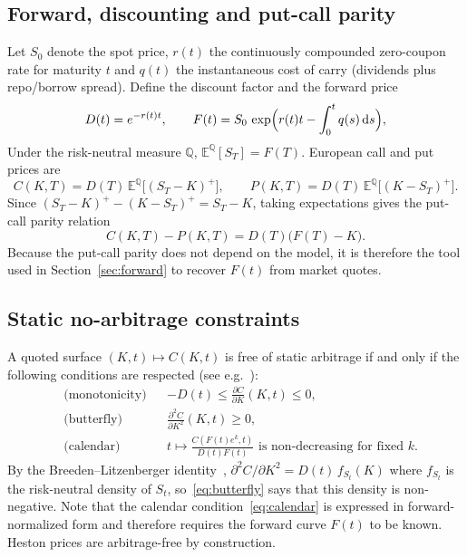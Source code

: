 \documentclass[11pt,a4paper]{article}
\theoremstyle{plain}
\theoremstyle{definition}
\newcommand{\dd}{\mathrm{d}}
\newcommand{\E}{\mathbb{E}}
\newcommand{\Q}{\mathbb{Q}}
\begin{document}
\subsection{Forward, discounting and put-call parity}
Let $S_0$ denote the spot price, $r(t)$ the continuously compounded zero-coupon rate for maturity $t$ and $q(t)$ the instantaneous cost of carry (dividends plus repo/borrow spread). Define the discount factor and the forward price
\begin{equation}
    D(t) = e^{-r(t)t}, \qquad F(t) = S_0\, \exp\Bigl(r(t)t-\int_0^t q(s)\,\dd s\Bigr),
    \label{eq:forward}
\end{equation}
Under the risk-neutral measure $\Q$, $\E^{\Q}[S_T]=F(T)$. European call and put prices are
\begin{equation}
    C(K,T) = D(T)\,\E^{\Q}\bigl[(S_T-K)^+\bigr], \qquad
    P(K,T) = D(T)\,\E^{\Q}\bigl[(K-S_T)^+\bigr].
\end{equation}
Since $(S_T-K)^+-(K-S_T)^+=S_T-K$, taking expectations gives the put-call parity relation
\begin{equation}
    C(K,T)-P(K,T) = D(T)\bigl(F(T)-K\bigr).
    \label{eq:pcp}
\end{equation}
Because the put-call parity does not depend on the model, it is therefore the tool used in Section~\ref{sec:forward} to recover $F(t)$ from market quotes.





\subsection{Static no-arbitrage constraints}
A quoted surface $(K,t)\mapsto C(K,t)$ is free of static arbitrage if and only if the following conditions are respected (see e.g.~\cite{gatheral, gatheraljacquier}):
\begin{align}
    &\text{(monotonicity)} && -D(t) \le \frac{\partial C}{\partial K}(K,t) \le 0, \label{eq:mono}\\
    &\text{(butterfly)} && \frac{\partial^2 C}{\partial K^2}(K,t) \ge 0, \label{eq:butterfly}\\
    &\text{(calendar)} && t\mapsto \frac{C(F(t)e^{k},t)}{D(t)F(t)} \text{ is non-decreasing for fixed } k. \label{eq:calendar}
\end{align}
By the Breeden--Litzenberger identity~\cite{breeden}, $\partial^2C/\partial K^2 = D(t)\,f_{S_t}(K)$ where $f_{S_t}$ is the risk-neutral density of $S_t$, so~\eqref{eq:butterfly} says that this density is non-negative. Note that the calendar condition~\eqref{eq:calendar} is expressed in forward-normalized form and therefore requires the forward curve $F(t)$ to be known. Heston prices are arbitrage-free by construction.
\end{document}
